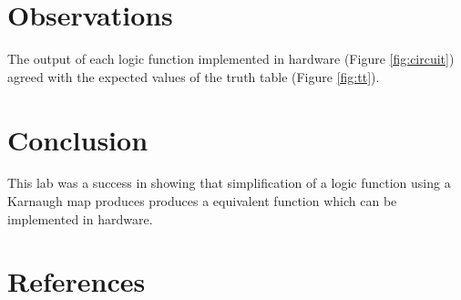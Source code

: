 \documentclass[12pt]{article}
\begin{document}
\clearpage

\section{Observations}

The output of each logic function implemented in hardware
(Figure \ref{fig:circuit}) agreed with the expected values
of the truth table (Figure \ref{fig:tt}).

\section{Conclusion}

This lab was a success in showing that simplification of a
logic function using a Karnaugh map produces produces a
equivalent function which can be implemented in hardware.


\renewcommand*{\refname}{\vspace{-8mm}}
\section{References}
%
%



\end{document}
